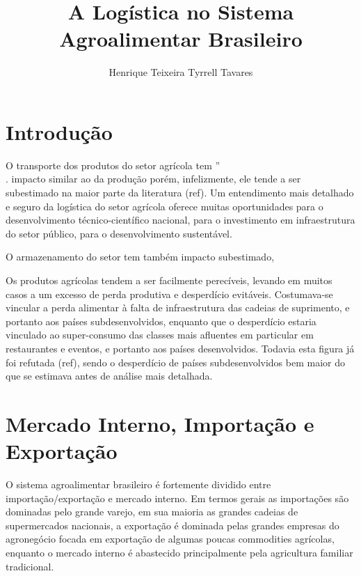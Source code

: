\documentclass[]{article}
\title{A Logística no Sistema Agroalimentar Brasileiro}
\author{Henrique Teixeira Tyrrell Tavares}
\begin{document}
	
	\maketitle
	
	\begin{abstract}
		
	\end{abstract}
	
	\section{Introdução}
	
	O transporte dos produtos do setor agrícola tem ''\\
	
	
	
	
	
	
	
	
	
	
	
	
	
	
	
	.	impacto similar ao da produção porém, infelizmente, ele tende a ser subestimado na maior parte da literatura (ref). Um entendimento mais detalhado e seguro da logística do setor agrícola oferece muitas oportunidades para o desenvolvimento técnico-científico nacional, para o investimento em infraestrutura do setor público, para o desenvolvimento sustentável.
	
	O armazenamento do setor tem também impacto subestimado, 
	
	Os produtos agrícolas tendem a ser facilmente perecíveis, levando em muitos casos a um excesso de perda produtiva e desperdício evitáveis. Costumava-se vincular a perda alimentar à falta de infraestrutura das cadeias de suprimento, e portanto aos países subdesenvolvidos, enquanto que o desperdício estaria vinculado ao super-consumo das classes mais afluentes em particular em restaurantes e eventos, e portanto aos países desenvolvidos. Todavia esta figura já foi refutada (ref), sendo o desperdício de países subdesenvolvidos bem maior do que se estimava antes de análise mais detalhada. 
	
	\section{Mercado Interno, Importação e Exportação}
	
	O sistema agroalimentar brasileiro é fortemente dividido entre importação/exportação e mercado interno. Em termos gerais as importações são dominadas pelo grande varejo, em sua maioria as grandes cadeias de supermercados nacionais, a exportação é dominada pelas grandes empresas do agronegócio focada em exportação de algumas poucas commodities agrícolas, enquanto o mercado interno é abastecido principalmente pela agricultura familiar tradicional. 
	
\end{document}
